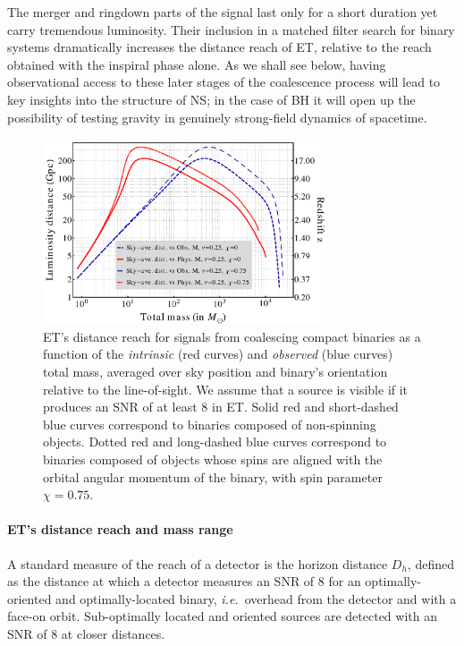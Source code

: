 The merger and ringdown parts of the signal last only for a short duration yet carry
tremendous luminosity. Their inclusion in a matched filter search for binary systems  
dramatically increases the distance reach of ET, relative to the reach obtained with the
inspiral phase alone. As we shall see below, having observational access to
these later stages of the coalescence process will lead to key insights into the 
structure of NS; in the case of BH it will open up the possibility of testing gravity 
in genuinely strong-field dynamics of spacetime.

\begin{figure}
\centering
\includegraphics[width=0.75\textwidth]{./Sec_ET_ScienceCase/ET_horDist_ETB.pdf}
\caption{
ET's distance reach for signals from coalescing compact binaries as a function 
of the \emph{intrinsic} (red curves) and \emph{observed} (blue curves) total mass,
averaged over sky position and binary's orientation relative to the line-of-sight.
We assume that a source is visible if it produces an SNR of at least 8 in ET. 
Solid red and short-dashed blue curves correspond to binaries composed of 
non-spinning objects. Dotted red and long-dashed blue curves
correspond to binaries composed of objects whose spins are aligned
with the orbital angular momentum of the binary, with spin parameter $\chi=0.75$.}
\label{fig:ET_range}
\end{figure}

\paragraph{ET's distance reach and mass range}
A standard measure of the reach of a detector is the horizon distance
$D_h$, defined as the distance at which a detector measures an SNR of 8
for an optimally-oriented and optimally-located binary, \emph{i.e.}\ overhead
from the detector and with a face-on orbit. Sub-optimally located and 
oriented sources are detected with an SNR of 8 at closer distances.

